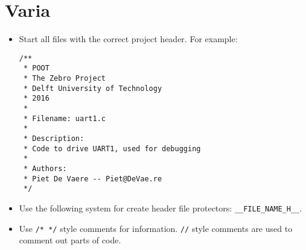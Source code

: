 \documentclass[11pt,a4paper]{article}
\begin{document}
\section{Varia}
\begin{itemize}
\item Start all files with the correct project header. For example:
\begin{verbatim}
/**
 * POOT
 * The Zebro Project
 * Delft University of Technology
 * 2016
 *
 * Filename: uart1.c
 *
 * Description:
 * Code to drive UART1, used for debugging
 *
 * Authors:
 * Piet De Vaere -- Piet@DeVae.re
 */
\end{verbatim}

\item Use the following system for create header file protectors: \verb|__FILE_NAME_H__|.

\item Use \verb|/* */| style comments for information. \verb|//| style comments are used to comment out parts of code.

\end{itemize}
\end{document}
